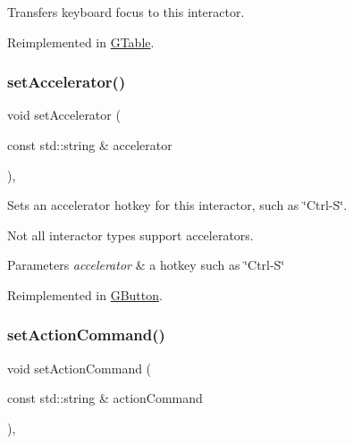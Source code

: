 Transfers keyboard focus to this interactor. 



Reimplemented in \mbox{\hyperlink{classGTable_a49b39e0eeaf5af829e8956e9055c5cdc}{G\+Table}}.

\mbox{\label{classGInteractor_ad15f102f62e2960576012f1aa0ba4b2e}} 
\subsubsection{\texorpdfstring{set\+Accelerator()}{setAccelerator()}}
{\footnotesize\ttfamily void set\+Accelerator (\begin{DoxyParamCaption}\item[{const std\+::string \&}]{accelerator }\end{DoxyParamCaption})\hspace{0.3cm}{\ttfamily [virtual]}, {\ttfamily [inherited]}}



Sets an accelerator hotkey for this interactor, such as \char`\"{}\+Ctrl-\/\+S\char`\"{}. 

Not all interactor types support accelerators. 
\begin{DoxyParams}{Parameters}
{\em accelerator} & a hotkey such as \char`\"{}\+Ctrl-\/\+S\char`\"{} \\
\hline
\end{DoxyParams}


Reimplemented in \mbox{\hyperlink{classGButton_a5f78fc506a33b57dced42a419be34446}{G\+Button}}.

\mbox{\label{classGInteractor_a4b5843fe3030e038a1ba54cc03389bcf}} 
\subsubsection{\texorpdfstring{set\+Action\+Command()}{setActionCommand()}}
{\footnotesize\ttfamily void set\+Action\+Command (\begin{DoxyParamCaption}\item[{const std\+::string \&}]{action\+Command }\end{DoxyParamCaption})\hspace{0.3cm}{\ttfamily [virtual]}, {\ttfamily [inherited]}}




